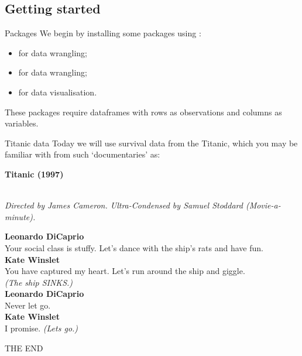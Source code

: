 \documentclass{beamer}
\begin{document}
\subsection{Getting started}
\begin{frame}[fragile]{Packages}
We begin by installing some packages using :
\begin{itemize}
\item {} for data wrangling;
\item {} for data wrangling;
\item {} for data visualisation.
\end{itemize}

These packages require dataframes with rows as observations and columns as variables.
\end{frame}


\begin{frame}{Titanic data}
Today we will use survival data from the Titanic, which you may be familiar with from such `documentaries' as: 
\bigskip

\textbf{Titanic (1997)}\\\
\begin{tiny}
\emph {Directed by James Cameron. Ultra-Condensed by Samuel Stoddard (Movie-a-minute).}
\end{tiny}
\begin{small}
\textbf{Leonardo DiCaprio}\\

\qquad  Your social class is stuffy. Let's dance with the ship's rats and have fun. \\

\textbf{Kate Winslet}\\

\qquad  You have captured my heart. Let's run around the ship and giggle. \\

\emph{(The ship SINKS.)}\\

\textbf{Leonardo DiCaprio}\\

\qquad    Never let go. \\

\textbf{Kate Winslet}\\

 \qquad   I promise. \emph{(Lets go.)}

THE END
\end{small}

\end{frame}
\end{document}
